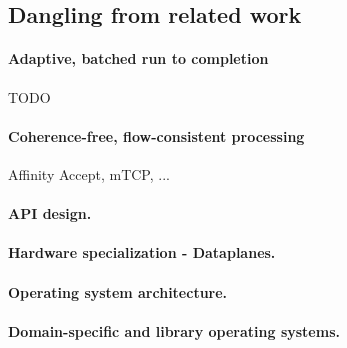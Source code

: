 \subsection{Dangling from related work}


\paragraph{Adaptive, batched run to completion}

\todo TODO

\paragraph{Coherence-free, flow-consistent processing}

\todo Affinity Accept, mTCP, ...



\paragraph{API design.}


\paragraph{Hardware specialization - Dataplanes.}

\paragraph{Operating system architecture.}

\paragraph{Domain-specific and library operating systems.}




